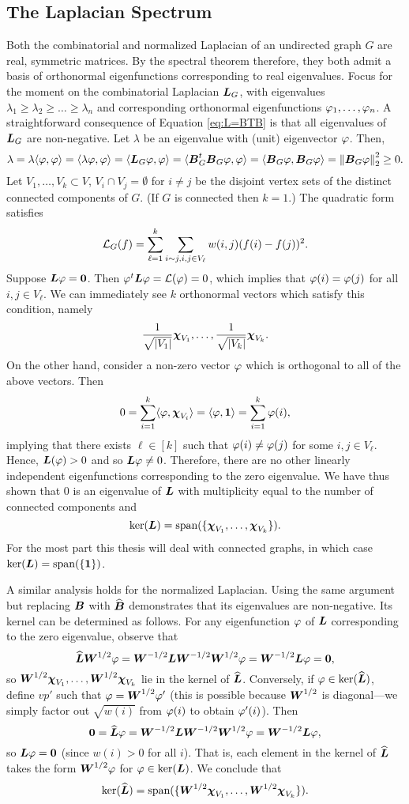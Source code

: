 \subsection{The Laplacian Spectrum}
Both the combinatorial and normalized Laplacian of an undirected graph $G$ are real, symmetric matrices. By the spectral theorem therefore, they both admit a basis of orthonormal eigenfunctions corresponding to real eigenvalues. Focus for the moment on the combinatorial Laplacian  $\vb*{L}_G$, with eigenvalues $\lambda_1\geq \lambda_2\geq \dots \geq \lambda_n$ and corresponding orthonormal eigenfunctions $\varphi_1,\dots,\varphi_n$. A straightforward consequence of Equation \ref{eq:L=BTB} is that all eigenvalues of $\vb*{L}_G$ are non-negative. Let $\lambda$ be an eigenvalue with (unit) eigenvector $\varphi$. Then,  \begin{equation*}
    \lambda = \lambda\langle \varphi,\varphi\rangle = \langle \lambda \varphi,\varphi\rangle = \langle \vb*{L}_G\varphi,\varphi\rangle = \langle \vb*{B}_G^t \vb*{B}_G\varphi,\varphi\rangle = \langle \vb*{B}_G\varphi,\vb*{B}_G\varphi\rangle =\norm{\vb*{B}_G\varphi}_2^2 \geq 0.
\end{equation*}
Let $V_1,\dots,V_k\subset V$, $V_i\cap V_j= \emptyset$ for $i\neq j$ be the disjoint vertex sets of the distinct connected components of $G$. (If $G$ is connected then $k=1$.) The quadratic form satisfies
\[\mathcal{L}_G(f) = \sum_{\ell=1}^k \sum_{i\sim j, i,j\in V_\ell} w(i,j)(f(i)-f(j))^2. \]
Suppose $\vb*{L}\varphi=\vb{0}$. Then $\varphi^t\vb*{L}\varphi=\mathcal{L}(\varphi)=0$, which implies that $\varphi(i)=\varphi(j)$ for all $i,j\in V_\ell$. We can immediately see $k$ orthonormal vectors which satisfy this condition, namely \[\frac{1}{\sqrt{|V_1|}} \boldsymbol{\chi}_{V_1},\dots, \frac{1}{\sqrt{|V_k|}} \boldsymbol{\chi}_{V_k}.\]
On the other hand, consider a non-zero vector $\varphi$ which is orthogonal to all of the above vectors. Then 
\[0=\sum_{i=1}^k \langle \varphi,\boldsymbol{\chi}_{V_i}\rangle = \langle \varphi,\vb{1} \rangle=\sum_{i=1}^k \varphi(i),\]
implying that there exists $\ell\in[k]$ such that $\varphi(i)\neq\varphi(j)$ for some $i,j\in V_\ell$. Hence, $\vb*{L}(\varphi)>0$ and so $\vb*{L}\varphi\neq 0$. Therefore, there are no other linearly independent eigenfunctions corresponding to the zero eigenvalue.  
We have thus shown that 0 is an eigenvalue of $\vb*{L}$ with multiplicity equal to the number of connected components and 
\[\ker(\vb*{L})=\textnormal{span}(\{\boldsymbol{\chi}_{V_1},\dots,\boldsymbol{\chi}_{V_k}\}).\]
For the most part this thesis will deal with connected graphs, in which case $\ker(\vb*{L})=\textnormal{span}(\{\vb{1}\})$.  

A similar analysis holds for the normalized Laplacian. Using the same argument but replacing $\vb*{B}$ with $\widehat{\vb*{B}}$ demonstrates that its eigenvalues are non-negative. Its kernel can be determined as follows. For any eigenfunction $\varphi$ of $\vb*{L}$ corresponding to the zero eigenvalue, observe that 
\[\widehat{\vb*{L}}\vb*{W}^{1/2}\varphi = \vb*{W}^{-1/2}\vb*{L}\vb*{W}^{-1/2}\vb*{W}^{1/2}\varphi = \vb*{W}^{-1/2}\vb*{L}\varphi = \vb{0},\]
so $\vb*{W}^{1/2}\boldsymbol{\chi}_{V_1},\dots,\vb*{W}^{1/2}\boldsymbol{\chi}_{V_k}$ lie in the kernel of $\widehat{\vb*{L}}$.
Conversely, if $\varphi\in\ker(\widehat{\vb*{L}})$, define $vp'$ such that $\varphi=\vb*{W}^{1/2}\varphi'$ (this is possible because $\vb*{W}^{1/2}$ is diagonal---we simply factor out $\sqrt{w(i)}$ from $\varphi(i)$ to obtain $\varphi'(i)$). Then 
\[\vb{0} =\widehat{\vb*{L}}\varphi = \vb*{W}^{-1/2}\vb*{L} \vb*{W}^{-1/2}\vb*{W}^{1/2}\varphi = \vb*{W}^{-1/2}\vb*{L}\varphi,\]
so $\vb*{L}\varphi=\vb{0}$ (since $w(i)>0$ for all $i$). That is, each element in the kernel of $\widehat{\vb*{L}}$ takes the form $\vb*{W}^{1/2}\varphi$ for $\varphi\in\ker(\vb*{L})$. We conclude that 
\[\ker(\widehat{\vb*{L}})=\textnormal{span}(\{\vb*{W}^{1/2}\boldsymbol{\chi}_{V_1},\dots,\vb*{W}^{1/2}\boldsymbol{\chi}_{V_k}\}).\]


